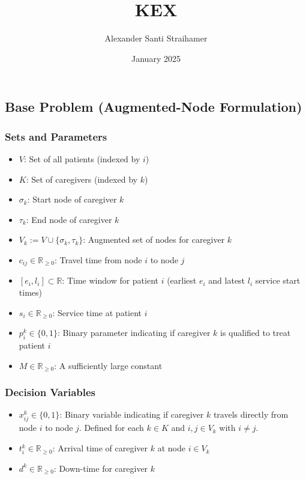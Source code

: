 \documentclass[a4paper]{article}
\title{KEX}
\author{Alexander Santi Straihamer}
\date{January 2025}
\begin{document}
\maketitle



\subsection{Base Problem (Augmented-Node Formulation)}

\subsubsection*{Sets and Parameters}

\begin{itemize}
\item $V$: Set of all patients (indexed by $i$)
\item $K$: Set of caregivers (indexed by $k$)
\item $\sigma_k$: Start node of caregiver $k$
\item $\tau_k$: End node of caregiver $k$
\item $V_k := V \cup \{\sigma_k, \tau_k\}$: Augmented set of nodes for caregiver $k$
\item $c_{ij} \in \mathbb{R}_{\geq 0}$: Travel time from node $i$ to node $j$
\item $[e_i, l_i] \subset \mathbb{R}$: Time window for patient $i$ (earliest $e_i$ and latest $l_i$ service start times)
\item $s_i \in \mathbb{R}_{\geq 0}$: Service time at patient $i$
\item $p_i^k \in \{0,1\}$: Binary parameter indicating if caregiver $k$ is qualified to treat patient $i$
\item $M \in \mathbb{R}_{\geq 0}$: A sufficiently large constant
\end{itemize}

\subsubsection*{Decision Variables}

\begin{itemize}
\item $x_{ij}^{k} \in \{0,1\}$: Binary variable indicating if caregiver $k$ travels directly from node $i$ to node $j$. Defined for each $k \in K$ and $i, j \in V_k$ with $i \neq j$.
\item $t_i^k \in \mathbb{R}_{\geq 0}$: Arrival time of caregiver $k$ at node $i \in V_k$
\item $d^k \in \mathbb{R}_{\geq 0}$: Down-time for caregiver $k$
\end{itemize}
\end{document}
